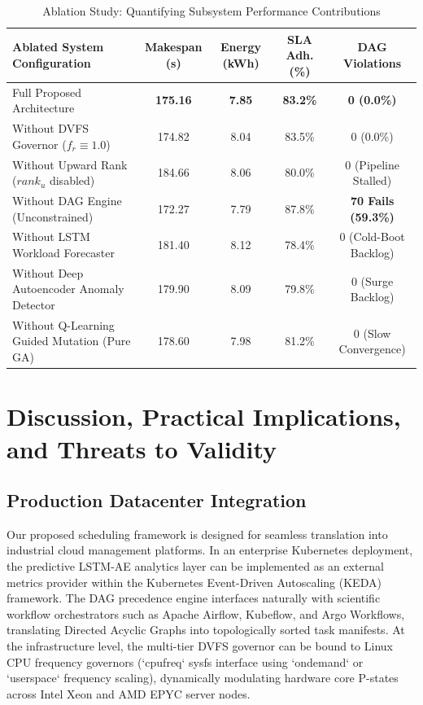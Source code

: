 \documentclass[default,sn-mathphys-num]{sn-jnl}
\theoremstyle{thmstyleone}
\theoremstyle{thmstyletwo}
\theoremstyle{thmstylethree}
\begin{document}
\begin{table}[t]
\caption{Ablation Study: Quantifying Subsystem Performance Contributions}\label{tab:ablation}
\centering
\small
\begin{tabular}{lcccc}
\toprule
\textbf{Ablated System Configuration} & \textbf{Makespan (s)} & \textbf{Energy (kWh)} & \textbf{SLA Adh. (\%)} & \textbf{DAG Violations} \\
\midrule
Full Proposed Architecture & \textbf{175.16} & \textbf{7.85} & \textbf{83.2\%} & \textbf{0 (0.0\%)} \\
Without DVFS Governor ($f_r \equiv 1.0$) & 174.82 & 8.04 & 83.5\% & 0 (0.0\%) \\
Without Upward Rank ($rank_u$ disabled) & 184.66 & 8.06 & 80.0\% & 0 (Pipeline Stalled) \\
Without DAG Engine (Unconstrained) & 172.27 & 7.79 & 87.8\% & \textbf{70 Fails (59.3\%)} \\
Without LSTM Workload Forecaster & 181.40 & 8.12 & 78.4\% & 0 (Cold-Boot Backlog) \\
Without Deep Autoencoder Anomaly Detector & 179.90 & 8.09 & 79.8\% & 0 (Surge Backlog) \\
Without Q-Learning Guided Mutation (Pure GA) & 178.60 & 7.98 & 81.2\% & 0 (Slow Convergence) \\
\bottomrule
\end{tabular}
\end{table}

\section{Discussion, Practical Implications, and Threats to Validity}\label{sec:discussion}

\subsection{Production Datacenter Integration}
Our proposed scheduling framework is designed for seamless translation into industrial cloud management platforms. In an enterprise Kubernetes deployment, the predictive LSTM-AE analytics layer can be implemented as an external metrics provider within the Kubernetes Event-Driven Autoscaling (KEDA) framework. The DAG precedence engine interfaces naturally with scientific workflow orchestrators such as Apache Airflow, Kubeflow, and Argo Workflows, translating Directed Acyclic Graphs into topologically sorted task manifests. At the infrastructure level, the multi-tier DVFS governor can be bound to Linux CPU frequency governors (`cpufreq` sysfs interface using `ondemand` or `userspace` frequency scaling), dynamically modulating hardware core P-states across Intel Xeon and AMD EPYC server nodes.
\end{document}
